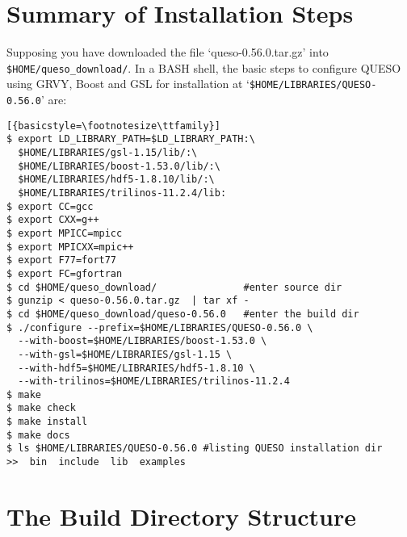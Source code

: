 \section{Summary of Installation Steps}\label{sec:summary}


Supposing you have downloaded the file `queso-0.56.0.tar.gz' into \texttt{\$HOME/queso\_download/}.
%
In a BASH shell, the basic steps to configure QUESO using GRVY, Boost and GSL for installation at 
`\verb+$HOME/LIBRARIES/QUESO-0.56.0+'  are:

\begin{lstlisting}[{basicstyle=\footnotesize\ttfamily}]
$ export LD_LIBRARY_PATH=$LD_LIBRARY_PATH:\
  $HOME/LIBRARIES/gsl-1.15/lib/:\
  $HOME/LIBRARIES/boost-1.53.0/lib/:\
  $HOME/LIBRARIES/hdf5-1.8.10/lib/:\
  $HOME/LIBRARIES/trilinos-11.2.4/lib:
$ export CC=gcc
$ export CXX=g++
$ export MPICC=mpicc
$ export MPICXX=mpic++
$ export F77=fort77
$ export FC=gfortran
$ cd $HOME/queso_download/               #enter source dir
$ gunzip < queso-0.56.0.tar.gz  | tar xf -
$ cd $HOME/queso_download/queso-0.56.0   #enter the build dir
$ ./configure --prefix=$HOME/LIBRARIES/QUESO-0.56.0 \
  --with-boost=$HOME/LIBRARIES/boost-1.53.0 \
  --with-gsl=$HOME/LIBRARIES/gsl-1.15 \
  --with-hdf5=$HOME/LIBRARIES/hdf5-1.8.10 \
  --with-trilinos=$HOME/LIBRARIES/trilinos-11.2.4
$ make 
$ make check
$ make install 
$ make docs
$ ls $HOME/LIBRARIES/QUESO-0.56.0 #listing QUESO installation dir
>>  bin  include  lib  examples
\end{lstlisting}

% 
% 


\section{The Build Directory Structure} \label{sc-source-dir-structure}

